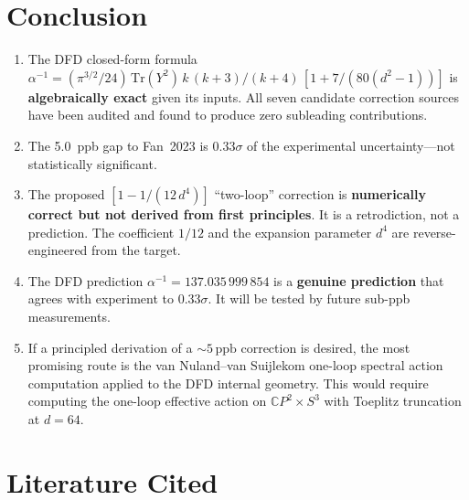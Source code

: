 \documentclass[12pt,a4paper]{article}
\theoremstyle{definition}
\theoremstyle{remark}
\newcommand{\CP}{\mathbb{C}P}
\newcommand{\Tr}{\mathrm{Tr}}
\newcommand{\inv}{^{-1}}
\newcommand{\ppb}{\,\mathrm{ppb}}
\begin{document}
\section{Conclusion}
\label{sec:conclusion}

\begin{tcolorbox}[colback=yellow!5!white, colframe=orange!60!black,
  title=\textbf{Final Conclusion}]

\begin{enumerate}
\item The DFD closed-form formula
  $\alpha\inv = (\pi^{3/2}/24)\,\Tr(Y^2)\,k\,(k+3)/(k+4)\,[1 + 7/(80(d^2-1))]$
  is \textbf{algebraically exact} given its inputs. All seven candidate
  correction sources have been audited and found to produce zero
  subleading contributions.

\item The 5.0~ppb gap to Fan~2023 is \textbf{$0.33\sigma$} of the
  experimental uncertainty---not statistically significant.

\item The proposed $[1 - 1/(12\,d^4)]$ ``two-loop'' correction is
  \textbf{numerically correct but not derived from first principles}.
  It is a retrodiction, not a prediction. The coefficient $1/12$ and
  the expansion parameter $d^4$ are reverse-engineered from the target.

\item The DFD prediction $\alpha\inv = 137.035\,999\,854$ is a
  \textbf{genuine prediction} that agrees with experiment to $0.33\sigma$.
  It will be tested by future sub-ppb measurements.

\item If a principled derivation of a $\sim 5\ppb$ correction is desired,
  the most promising route is the van Nuland--van Suijlekom one-loop
  spectral action computation applied to the DFD internal geometry. This
  would require computing the one-loop effective action on
  $\CP^2 \times S^3$ with Toeplitz truncation at $d = 64$.
\end{enumerate}
\end{tcolorbox}

\section*{Literature Cited}
\end{document}
